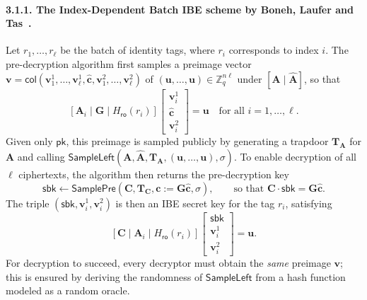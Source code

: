 \paragraph{3.1.1. The Index-Dependent Batch IBE scheme by Boneh, Laufer and Tas~\cite{EPRINT:BonLauTas25}.}
Let $r_1, \dots, r_\ell$ be the batch of identity tags, where $r_i$ corresponds to
index $i$. The pre-decryption algorithm first samples a preimage vector
$
  \mathbf{v} = \mathsf{col}(\mathbf{v}^1_1, \dots, \mathbf{v}^1_\ell,
  \hat{\mathbf{c}}, \mathbf{v}^2_1, \dots, \mathbf{v}^2_\ell)
$
of $(\mathbf{u}, \dots, \mathbf{u}) \in \mathbb{Z}_q^{n\ell}$ under
$[\mathbf{A} \mid \hat{\mathbf{A}}]$, so that
\[
  [\mathbf{A}_i \mid \mathbf{G} \mid H_{\mathsf{ro}}(r_i)]
  \begin{bmatrix} \mathbf{v}^1_i \\ \hat{\mathbf{c}} \\ \mathbf{v}^2_i \end{bmatrix}
  = \mathbf{u}
  \quad \text{for all } i = 1, \dots, \ell.
\]
Given only $\mathsf{pk}$, this preimage is sampled publicly by generating a
trapdoor $\mathbf{T}_{\mathbf{A}}$ for $\mathbf{A}$ and calling
$\mathsf{SampleLeft}(\mathbf{A}, \hat{\mathbf{A}}, \mathbf{T}_{\mathbf{A}},
(\mathbf{u}, \dots, \mathbf{u}), \sigma)$. To enable decryption of all $\ell$
ciphertexts, the algorithm then returns the pre-decryption key
\[
  \mathsf{sbk} \leftarrow \mathsf{SamplePre}(\mathbf{C}, \mathbf{T}_{\mathbf{C}},
  \mathbf{c} := \mathbf{G}\hat{\mathbf{c}}, \sigma),
  \qquad \text{so that } \mathbf{C} \cdot \mathsf{sbk} = \mathbf{G}\hat{\mathbf{c}}.
\]
The triple $(\mathsf{sbk}, \mathbf{v}^1_i, \mathbf{v}^2_i)$ is then an IBE secret
key for the tag $r_i$, satisfying
\[
  [\mathbf{C} \mid \mathbf{A}_i \mid H_{\mathsf{ro}}(r_i)]
  \begin{bmatrix} \mathsf{sbk} \\ \mathbf{v}^1_i \\ \mathbf{v}^2_i \end{bmatrix}
  = \mathbf{u}.
\]
For decryption to succeed, every decryptor must obtain the \emph{same} preimage
$\mathbf{v}$; this is ensured by deriving the randomness of $\mathsf{SampleLeft}$
from a hash function modeled as a random oracle.

